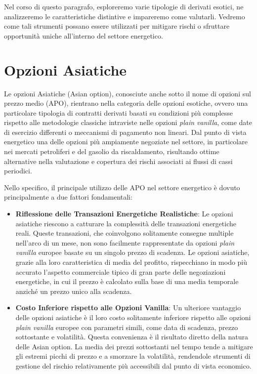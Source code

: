 \documentclass[12pt,a4paper]{report}
\begin{document}
Nel corso di questo paragrafo, esploreremo varie tipologie di derivati esotici, ne analizzeremo le caratteristiche distintive e impareremo come valutarli. Vedremo come tali strumenti possano essere utilizzati per mitigare rischi o sfruttare opportunità uniche all'interno del settore energetico. 


\section{Opzioni Asiatiche}


Le opzioni Asiatiche (Asian option), conosciute anche sotto il nome di opzioni sul prezzo medio (APO), rientrano nella categoria delle opzioni esotiche, ovvero una particolare tipologia di contratti derivati basati su condizioni più complesse rispetto alle metodologie classiche intraviste nelle opzioni \textit{plain vanilla}, come date di esercizio differenti o meccanismi di pagamento non lineari. Dal punto di vista energetico una delle opzioni più ampiamente negoziate nel settore, in particolare nei mercati petroliferi e del gasolio da riscaldamento,  risultando ottime alternative nella valutazione e copertura dei rischi associati ai flussi di cassi periodici.

Nello specifico, il principale utilizzo delle APO nel settore energetico è dovuto principalmente a due fattori fondamentali:
 \begin{itemize}

\item \textbf{Riflessione delle Transazioni Energetiche Realistiche}: Le opzioni asiatiche riescono a catturare la complessità delle transazioni energetiche reali. Queste transazioni, che coinvolgono solitamente consegne multiple nell'arco di un mese, non sono facilmente rappresentate da opzioni \textit{plain vanilla} europee basate su un singolo prezzo di scadenza. Le opzioni asiatiche, grazie alla loro caratteristica di media del profitto, rispecchiano in modo più accurato l'aspetto commerciale tipico di gran parte delle negoziazioni energetiche, in cui il prezzo è calcolato sulla base di una media temporale anziché un prezzo unico alla scadenza.

\item \textbf{Costo Inferiore rispetto alle Opzioni Vanilla}: Un ulteriore vantaggio delle opzioni asiatiche è il loro costo solitamente inferiore rispetto alle opzioni \textit{plain vanilla} europee con parametri simili, come data di scadenza, prezzo sottostante e volatilità. Questa convenienza è il risultato diretto della natura delle Asian option. La media dei prezzi sottostanti nel tempo tende a mitigare gli estremi picchi di prezzo e a smorzare la volatilità, rendendole strumenti di gestione del rischio relativamente più accessibili dal punto di vista economico.
 \end{itemize}
\end{document}
